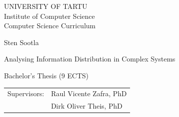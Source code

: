 \documentclass[12pt]{article}
\begin{document}
\thispagestyle{empty}
\begin{center}

\large
UNIVERSITY OF TARTU\\[2mm]
Institute of Computer Science\\
Computer Science Curriculum\\[2mm]

\vspace{25mm}

\Large Sten Sootla

\vspace{4mm}

\huge Analysing Information Distribution in Complex Systems

\vspace{20mm}

\Large Bachelor's Thesis (9 ECTS)

\end{center}

\vspace{2mm}

\begin{flushright}
 {
 \setlength{\extrarowheight}{5pt}
 \begin{tabular}{r l} 
  \sffamily Supervisors: & \sffamily Raul Vicente Zafra, PhD \\
  \sffamily & \sffamily Dirk Oliver Theis, PhD
 \end{tabular}
 }
\end{flushright}

\vspace{10mm}

\vspace{2mm}



\vspace{2mm}


\vspace{8mm}
\end{document}
